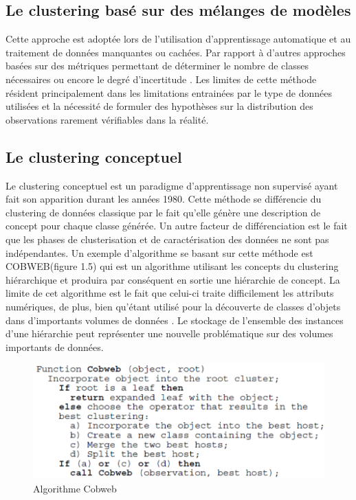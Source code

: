 \documentclass[memoire.tex]{subfiles}
\begin{document}
\subsection{Le clustering basé sur des mélanges de modèles}
Cette approche est adoptée lors de l'utilisation d'apprentissage automatique et au traitement de données manquantes ou cachées. Par rapport à d'autres approches basées sur des métriques permettant de déterminer le nombre de classes nécessaires  ou encore  le degré d'incertitude \cite{ref10}. Les limites de cette méthode résident principalement dans les limitations entrainées par le type de données utilisées et la nécessité de formuler des hypothèses sur la distribution des observations rarement vérifiables dans la réalité.\cite{ref8}

\subsection{Le clustering conceptuel}
Le clustering conceptuel est un paradigme d'apprentissage non supervisé ayant fait son apparition durant les années 1980. Cette méthode se différencie du clustering de données classique par le fait qu'elle génère une description de concept pour chaque classe générée. Un autre facteur de différenciation est le fait que les phases de clusterisation et de caractérisation des données ne sont pas indépendantes.\cite{ref11}
Un exemple d’algorithme se basant sur cette méthode est COBWEB(figure 1.5) qui est un algorithme utilisant les concepts du clustering hiérarchique et produira par conséquent en sortie une hiérarchie de concept. 
La limite de cet algorithme est le fait que celui-ci traite difficilement les attributs numériques\cite{ref8}, de plus, bien qu’étant utilisé pour la découverte de classes d’objets dans d’importants volumes de données 
\cite{ref14}. Le stockage de l'ensemble des instances d’une hiérarchie peut représenter une nouvelle problématique sur des volumes importants de données.
	\begin{figure}[h!]
		\centerline{\includegraphics[scale=0.7]{img/cobweb.png}}
		\caption{Algorithme Cobweb}
	\end{figure}
\end{document}
